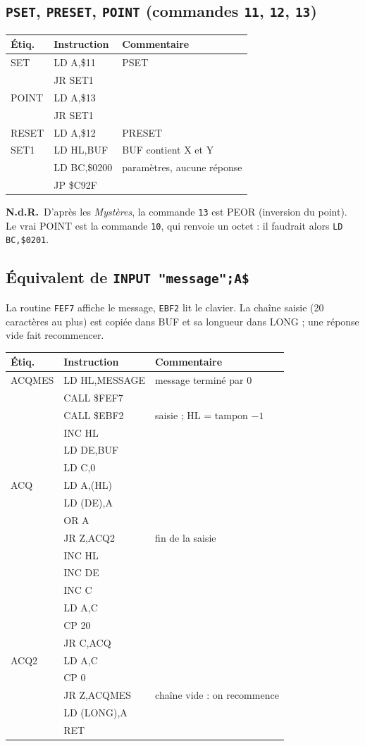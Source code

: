 \documentclass[a4paper,10pt]{article}
\makeatletter
\newcommand{\hex}[1]{\texttt{#1}}
\newcommand{\nota}[1]{\textcolor{red!60!black}{\small\textbf{N.d.R.}~#1}}
\newenvironment{src}
  {\small\begin{longtable}{@{}>{\ttfamily}l>{\ttfamily}l>{\raggedright\arraybackslash}p{8.6cm}@{}}
   \toprule
   \normalfont\bfseries Étiq. & \normalfont\bfseries Instruction & \textbf{Commentaire}\\
   \midrule\endhead
   \bottomrule\endfoot}
  {\end{longtable}}
\makeatother
\begin{document}
\subsection{\texttt{PSET}, \texttt{PRESET}, \texttt{POINT} (commandes \hex{11}, \hex{12}, \hex{13})}
\begin{src}
SET & LD A,\$11 & PSET \\
 & JR SET1 & \\
POINT & LD A,\$13 & \\
 & JR SET1 & \\
RESET & LD A,\$12 & PRESET \\
SET1 & LD HL,BUF & BUF contient X et Y \\
 & LD BC,\$0200 & 2 paramètres, aucune réponse \\
 & JP \$C92F & \\
\end{src}
\nota{D'après les \emph{Mystères}, la commande \hex{13} est PEOR (inversion du
point). Le vrai POINT est la commande \hex{10}, qui renvoie un octet : il
faudrait alors \texttt{LD BC,\$0201}.}

\subsection{Équivalent de \texttt{INPUT "message";A\$}}
La routine \hex{FEF7} affiche le message, \hex{EBF2} lit le clavier. La
chaîne saisie (20 caractères au plus) est copiée dans BUF et sa longueur
dans LONG ; une réponse vide fait recommencer.
\begin{src}
ACQMES & LD HL,MESSAGE & message terminé par 0 \\
 & CALL \$FEF7 & \\
 & CALL \$EBF2 & saisie ; HL = tampon $-1$ \\
 & INC HL & \\
 & LD DE,BUF & \\
 & LD C,0 & \\
ACQ & LD A,(HL) & \\
 & LD (DE),A & \\
 & OR A & \\
 & JR Z,ACQ2 & fin de la saisie \\
 & INC HL & \\
 & INC DE & \\
 & INC C & \\
 & LD A,C & \\
 & CP 20 & \\
 & JR C,ACQ & \\
ACQ2 & LD A,C & \\
 & CP 0 & \\
 & JR Z,ACQMES & chaîne vide : on recommence \\
 & LD (LONG),A & \\
 & RET & \\
\end{src}
\end{document}
